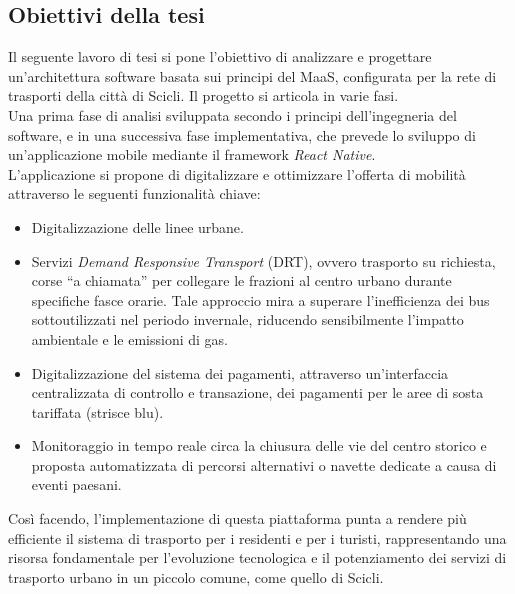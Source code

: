 \subsection*{Obiettivi della tesi }
Il seguente lavoro di tesi si pone l’obiettivo di analizzare e progettare un’architettura software basata sui principi del MaaS, configurata per la rete di trasporti della città di Scicli. Il progetto si articola in varie fasi. 
\\
Una prima fase di analisi sviluppata secondo i principi dell’ingegneria del software, e in una successiva fase implementativa, che prevede lo sviluppo di un’applicazione mobile mediante il framework \textit{React Native}.
\\
L’applicazione si propone di digitalizzare e ottimizzare l’offerta di mobilità attraverso le seguenti funzionalità chiave:
\begin{itemize}
    \item Digitalizzazione delle linee urbane.
    \item Servizi \textit{Demand Responsive Transport} (DRT), ovvero trasporto su richiesta, corse ``a chiamata'' per collegare le frazioni al centro urbano durante specifiche fasce orarie. Tale approccio mira a superare l’inefficienza dei bus sottoutilizzati nel periodo invernale, riducendo sensibilmente l’impatto ambientale e le emissioni di gas.
    \item Digitalizzazione del sistema dei pagamenti, attraverso un’interfaccia centralizzata di controllo e transazione, dei pagamenti per le aree di sosta tariffata (strisce blu).
    \item Monitoraggio in tempo reale circa la chiusura delle vie del centro storico e proposta automatizzata di percorsi alternativi o navette dedicate a causa di eventi paesani.
\end{itemize}
Così facendo, l’implementazione di questa piattaforma punta a rendere più efficiente il sistema di trasporto per i residenti e per i turisti, rappresentando una risorsa fondamentale per l’evoluzione tecnologica e il potenziamento dei servizi di trasporto urbano in un piccolo comune, come quello di Scicli.
